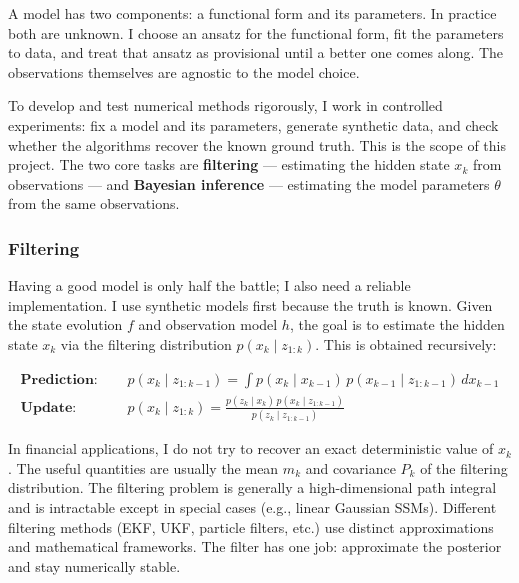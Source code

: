 \documentclass{article}
\begin{document}
A model has two components: a functional form and its parameters. In practice both are unknown. I choose an ansatz for the functional form, fit the parameters to data, and treat that ansatz as provisional until a better one comes along. The observations themselves are agnostic to the model choice.

To develop and test numerical methods rigorously, I work in controlled experiments: fix a model and its parameters, generate synthetic data, and check whether the algorithms recover the known ground truth. This is the scope of this project. The two core tasks are \textbf{filtering} --- estimating the hidden state $x_k$ from observations --- and \textbf{Bayesian inference} --- estimating the model parameters $\theta$ from the same observations.







\subsubsection{Filtering}

Having a good model is only half the battle; I also need a reliable implementation. I use synthetic models first because the truth is known. Given the state evolution $f$ and observation model $h$, the goal is to estimate the hidden state $x_k$ via the filtering distribution $p(x_k \mid z_{1:k})$. This is obtained recursively:

\begin{equation}
\begin{split}
   \textbf{Prediction: } & \quad p(x_k \mid z_{1:k-1}) = \int p(x_k \mid x_{k-1}) \, p(x_{k-1} \mid z_{1:k-1}) \, dx_{k-1} \\[1ex]
   \textbf{Update: }     & \quad p(x_k \mid z_{1:k}) = \frac{p(z_k \mid x_k) \, p(x_k \mid z_{1:k-1})}{p(z_k \mid z_{1:k-1})}
\end{split}
\end{equation}

In financial applications, I do not try to recover an exact deterministic value of $x_k$. The useful quantities are usually the mean $m_k$ and covariance $P_k$ of the filtering distribution. The filtering problem is generally a high-dimensional path integral and is intractable except in special cases (e.g., linear Gaussian SSMs). Different filtering methods (EKF, UKF, particle filters, etc.) use distinct approximations and mathematical frameworks. The filter has one job: approximate the posterior and stay numerically stable.
\end{document}
